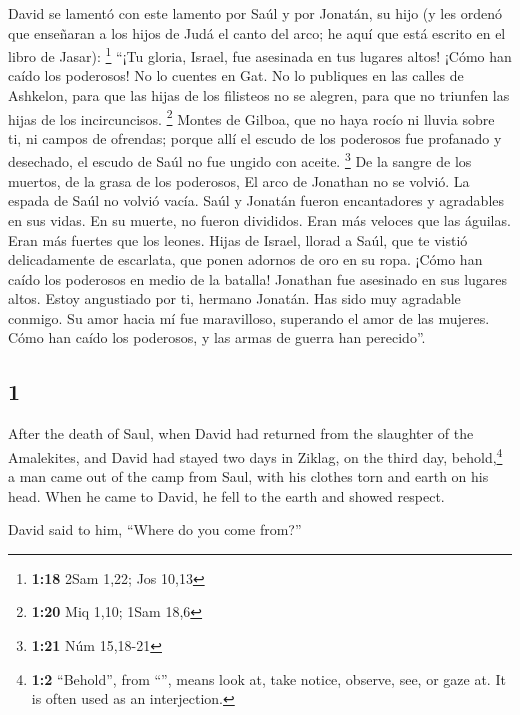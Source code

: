 \begin{paracol}{2}
 David se lamentó con este lamento por Saúl y por
Jonatán, su hijo  (y les ordenó que enseñaran a los hijos
de Judá el canto del arco; he aquí que está escrito en el libro de
Jasar): \footnote{\textbf{1:18} 2Sam 1,22; Jos 10,13} 
``¡Tu gloria, Israel, fue asesinada en tus lugares altos! ¡Cómo han
caído los poderosos!  No lo cuentes en Gat. No lo
publiques en las calles de Ashkelon, para que las hijas de los filisteos
no se alegren, para que no triunfen las hijas de los incircuncisos.
\footnote{\textbf{1:20} Miq 1,10; 1Sam 18,6}  Montes de
Gilboa, que no haya rocío ni lluvia sobre ti, ni campos de ofrendas;
porque allí el escudo de los poderosos fue profanado y desechado, el
escudo de Saúl no fue ungido con aceite. \footnote{\textbf{1:21} Núm
  15,18-21}  De la sangre de los muertos, de la grasa de
los poderosos, El arco de Jonathan no se volvió. La espada de Saúl no
volvió vacía.  Saúl y Jonatán fueron encantadores y
agradables en sus vidas. En su muerte, no fueron divididos. Eran más
veloces que las águilas. Eran más fuertes que los leones.
 Hijas de Israel, llorad a Saúl, que te vistió
delicadamente de escarlata, que ponen adornos de oro en su ropa.
 ¡Cómo han caído los poderosos en medio de la batalla!
Jonathan fue asesinado en sus lugares altos.  Estoy
angustiado por ti, hermano Jonatán. Has sido muy agradable conmigo. Su
amor hacia mí fue maravilloso, superando el amor de las mujeres.
 Cómo han caído los poderosos, y las armas de guerra han
perecido''.

\switchcolumn
\begin{otherlanguage}{english}

\hypertarget{section-1}{%
\section{1}\label{section-1}}

 After the death of Saul, when David had returned from the
slaughter of the Amalekites, and David had stayed two days in Ziklag,
 on the third day, behold,\footnote{\textbf{1:2}
  ``Behold'', from ``'', means look at, take notice,
  observe, see, or gaze at. It is often used as an interjection.} a man
came out of the camp from Saul, with his clothes torn and earth on his
head. When he came to David, he fell to the earth and showed respect.

 David said to him, ``Where do you come from?''


\end{otherlanguage}
\end{paracol}
